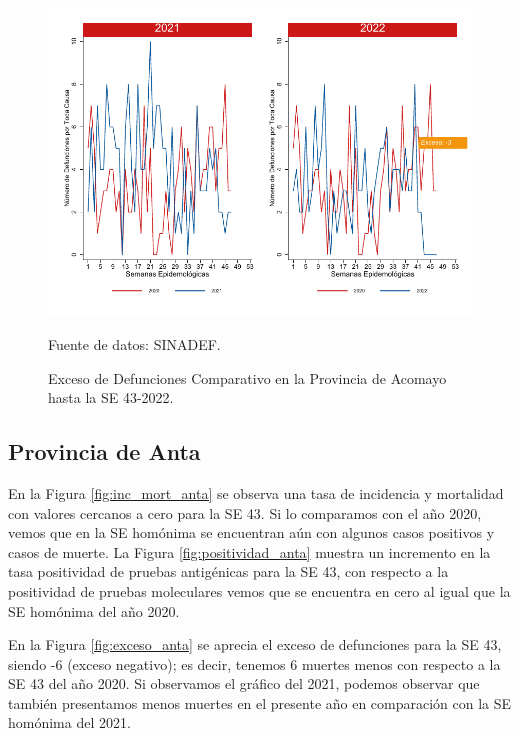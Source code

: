 \documentclass[12pt,a4paper,openany]{book}
\begin{document}
	\begin{figure}[h]
		\caption{Exceso de Defunciones Comparativo en la Provincia de Acomayo hasta la SE 43-2022.}\label{fig:exceso_acomayo}
		\begin{center}
			\includegraphics[width=0.7\linewidth]{../figuras/exceso_1.pdf}
		\end{center}
		{\footnotesize {Fuente de datos: SINADEF.}}
	\end{figure}
	
	\clearpage
	
	\subsection*{Provincia de Anta}
	\noindent En la Figura \ref{fig:inc_mort_anta} se observa una tasa de incidencia y mortalidad con valores cercanos a cero para la SE 43. Si lo comparamos con el año 2020, vemos que en la SE homónima se encuentran aún con algunos casos positivos y casos de muerte.
	\noindent La Figura \ref{fig:positividad_anta} muestra un incremento en la tasa positividad de pruebas antigénicas para la SE 43, con respecto a la positividad de pruebas moleculares vemos que se encuentra en cero al igual que la SE homónima del año 2020.
	
	En la Figura \ref{fig:exceso_anta} se aprecia el exceso de defunciones para la SE 43, siendo -6 (exceso negativo); es decir, tenemos 6 muertes menos con respecto a la SE 43 del año 2020. Si observamos el gráfico del 2021, podemos observar que también presentamos menos muertes en el presente año en comparación con la SE homónima del 2021.
	
\end{document}
